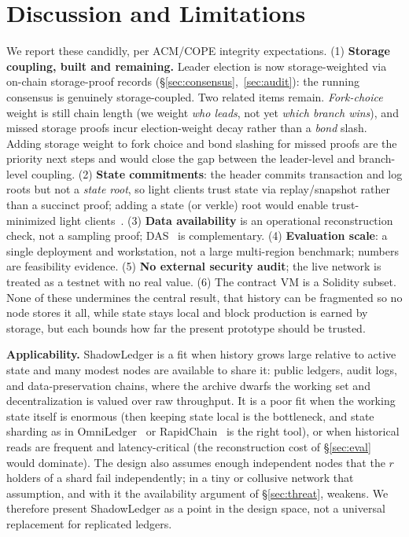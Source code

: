 \section{Discussion and Limitations}
\label{sec:disc}
We report these candidly, per ACM/COPE integrity expectations. (1) \textbf{Storage coupling, built
and remaining.} Leader election is now storage-weighted via on-chain storage-proof records
(\S\ref{sec:consensus},~\ref{sec:audit}): the running consensus is genuinely storage-coupled. Two
related items remain. \emph{Fork-choice} weight is still chain length (we weight \emph{who leads},
not yet \emph{which branch wins}), and missed storage proofs incur election-weight decay rather than
a \emph{bond} slash. Adding storage weight to fork choice and bond slashing for missed proofs are
the priority next steps and would close the gap between the leader-level and branch-level coupling. (2) \textbf{State commitments}: the header
commits transaction and log roots but not a \emph{state root}, so light clients trust state via
replay/snapshot rather than a succinct proof; adding a state (or verkle) root would enable
trust-minimized light clients~\cite{bunz2020flyclient}. (3) \textbf{Data availability} is an
operational reconstruction check, not a sampling proof; DAS~\cite{hallandersen2025foundations}
is complementary. (4) \textbf{Evaluation scale}: a single deployment and workstation, not a
large multi-region benchmark; numbers are feasibility evidence. (5) \textbf{No external security
audit}; the live network is treated as a testnet with no real value. (6) The contract VM is a
Solidity subset. None of these undermines the central result, that history can be fragmented so
no node stores it all, while state stays local and block production is earned by storage, but
each bounds how far the present prototype should be trusted.

\textbf{Applicability.} ShadowLedger is a fit when history grows large relative to active state and
many modest nodes are available to share it: public ledgers, audit logs, and data-preservation
chains, where the archive dwarfs the working set and decentralization is valued over raw
throughput. It is a poor fit when the working state itself is enormous (then keeping state local is
the bottleneck, and state sharding as in OmniLedger~\cite{kokoriskogias2018omniledger} or
RapidChain~\cite{zamani2018rapidchain} is the right tool), or when historical reads are frequent
and latency-critical (the reconstruction cost of \S\ref{sec:eval} would dominate). The design also
assumes enough independent nodes that the $r$ holders of a shard fail independently; in a tiny or
collusive network that assumption, and with it the availability argument of \S\ref{sec:threat},
weakens. We therefore present ShadowLedger as a point in the design space, not a universal
replacement for replicated ledgers.

